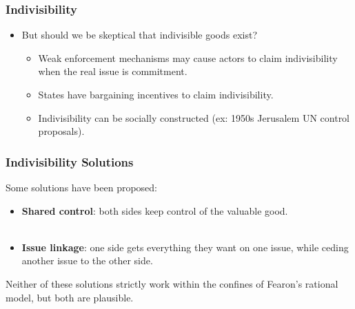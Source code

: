 \documentclass[handout]{beamer}
\begin{document}

\begin{frame} 
	\frametitle{\LARGE{Indivisibility}}
	\begin{itemize}
		\item But should we be skeptical that indivisible goods exist? \pause 
		\begin{itemize}
			\item Weak enforcement mechanisms may cause actors to claim indivisibility when the real issue is commitment. \pause 
			\item States have bargaining incentives to claim indivisibility. \pause 
			\item Indivisibility can be socially constructed (ex: 1950s Jerusalem UN control proposals).
		\end{itemize}
	\end{itemize}
\end{frame}

\begin{frame} 
	\frametitle{\LARGE{Indivisibility Solutions}}
	Some solutions have been proposed:
	\begin{itemize}
		\item \textbf{Shared control}: both sides keep control of the valuable good. \pause \\~\\
		\item \textbf{Issue linkage}: one side gets everything they want on one issue, while ceding another issue to the other side. \pause 
	\end{itemize}
	Neither of these solutions strictly work within the confines of Fearon's rational model, but both are plausible.
\end{frame}
\end{document}
